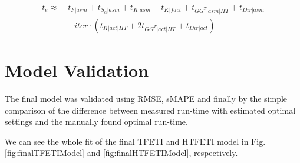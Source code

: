 \begin{equation}
\begin{aligned}
t_e \approx\; &t_{F|asm} + t_{S_\alpha|asm} + t_{K|asm} + t_{K|fact} + t_{GG^T|asm|HT}  + t_{Dir|asm}\\
&+ iter \cdot (t_{K|act|HT} + 2t_{GG^T|act|HT} + t_{Dir|act})
\end{aligned}
\label{eq:finalHTFETIDirichlet}
\end{equation}


\section{Model Validation}
The final model was validated using RMSE\cite{rmse}, sMAPE\cite{smape} and finally
by the simple comparison of the difference between measured run-time with estimated 
optimal settings and the manually found optimal run-time.

We can see the whole fit of the final TFETI and HTFETI model in Fig. \ref{fig:finalTFETIModel} and \ref{fig:finalHTFETIModel}, respectively.

